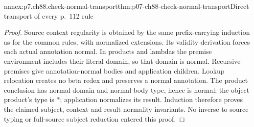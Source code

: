 \begin{annexitem}{annex:p7.ch88.check-normal-transport}{thm:p07-ch88-check-normal-transport}{Direct transport of every p.~112 rule}
\begin{proof}
Source context regularity is obtained by the same prefix-carrying
induction as for the common rules, with normalized extensions. Its
validity derivation forces each actual annotation normal. In products
and lambdas the premise environment includes their literal domain,
so that domain is normal. Recursive premises give annotation-normal
bodies and application children. Lookup relocation creates no beta
redex and preserves a normal annotation. The product conclusion has
normal domain and normal body type, hence is normal; the object
product's type is \(\ast\); application normalizes its result.
Induction therefore proves the claimed subject, context and result
normality invariants. No inverse to source typing or full-source
subject reduction entered this proof.
\end{proof}
\end{annexitem}


